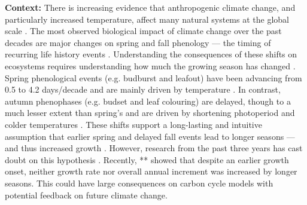 \documentclass[12pt]{article}
\begin{document}
\textbf {Context:} There is increasing evidence that anthropogenic climate change, and particularly increased temperature, affect many natural systems at the global scale \cite{parmesan_poleward_1999,rosenzweig_attributing_2008}. The most observed biological impact of climate change over the past decades are major changes on spring and fall phenology --- the timing of recurring life history events \cite{parmesan_globally_2003}. Understanding the consequences of these shifts on ecosystems requires understanding how much the growing season has changed \cite{duputie_phenological_2015}. Spring phenological events (e.g. budburst and leafout) have been advancing from 0.5 \cite{wolfe_climate_2005} to 4.2 days/decade \cite{chmielewski_response_2001,fu_recent_2014} and are mainly driven by temperature \cite{chuine_why_2010,cleland_shifting_2007,penuelas_responses_2001}. In contrast, autumn phenophases (e.g. budset and leaf colouring) are delayed, though to a much lesser extent than spring's \cite{gallinat_autumn_2015,jeong_macroscale_2014} and are driven by shortening photoperiod \cite{cooke_dynamic_2012,flynn_temperature_2018,korner_phenology_2010} and colder temperatures \cite{cooke_dynamic_2012,delpierre_temperate_2016}. These shifts support a long-lasting and intuitive assumption that earlier spring and delayed fall events lead to longer seasons ---and thus increased growth \cite{keenan_net_2014}. However, research from the past three years has cast doubt on this hypothesis \cite{dow_warm_2022,green_limits_2022,silvestro_longer_2023}. Recently, \cite{dow_warm_2022}** showed that despite an earlier growth onset, neither growth rate nor overall annual increment was increased by longer seasons. This could have large consequences on carbon cycle models with potential feedback on future climate change.\\
\end{document}
